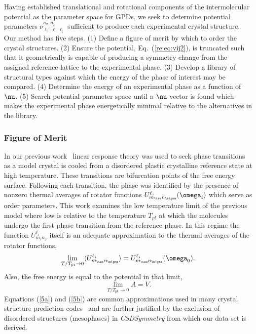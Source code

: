 \documentclass[preprint]{iucr}              %
\newcommand{\mb}[1]{\ensuremath{\mbox{\boldmath $ #1 $}}}
\newcommand{\av}[1]{\ensuremath{\langle #1 \rangle}}
\begin{document}
Having established translational and rotational components of the
intermolecular potential as the parameter space for GPDs, we seek to
determine potential parameters
$\nu_{\ell_i,\ell,\ell_j}^{n_\sigma,n_\mu}$ sufficient to produce
each experimental crystal structure. Our method has five steps. (1)
Define a figure of merit by which to order the crystal structures. (2)
Ensure the potential, Eq.~(\ref{re:eq:vij2}), is truncated such that
it geometrically is capable of producing a symmetry change from the
assigned reference lattice to the experimental phase. (3) Develop a
library of structural types against which the energy of the phase of interest
may be
compared. (4) Determine the energy of an experimental phase as a
function of $\mb{\nu}$. (5) Search potential parameter space until a
$\mb{\nu}$ vector is found which makes the experimental phase
energetically minimal relative to the alternatives in the library.

\subsubsection{Figure of Merit}

In our previous work~\cite{Keith04c,Mettes04} linear response theory
was used to seek phase transitions as a model crystal is cooled from
a disordered plastic crystalline reference state at high temperature. These
transitions are bifurcation points of the free energy surface.
Following each transition, the phase was identified by the presence
of nonzero thermal averages of rotator functions $U^{\ell_i}_{m_\tau
n_\sigma}(\mb{\omega}_i)$ which serve as order parameters. This work
examines the low temperature limit of the previous model where low
is relative to the temperature $T_{pt}$ at which the molecules
undergo the first
phase transition from the reference phase. 
In this regime the function $U^{\ell_i}_{m_\tau n_\sigma}$ itself is
an adequate approximation to the thermal averages of the rotator
functions,
\begin{equation}\label{5a}
\lim_{T/T_{\mathrm{pt}}\rightarrow 0}\av{U^{\ell_i}_{m_\tau
n_\sigma}}=U^{\ell_i}_{m_\tau n_\sigma}(\mb{\omega}_0).
\end{equation}
Also, the free energy is equal to the potential in that limit,
\begin{equation}\label{5b}
\lim_{T/T_{\mathrm{pt}}\rightarrow 0}A=V.
\end{equation}
Equations (\ref{5a}) and (\ref{5b}) are common approximations used in
many crystal structure prediction codes~\cite{Verwer98} and are
further justified by the exclusion of disordered structures (mesophases) in
\emph{CSDSymmetry} from which our data set is derived.
\end{document}
